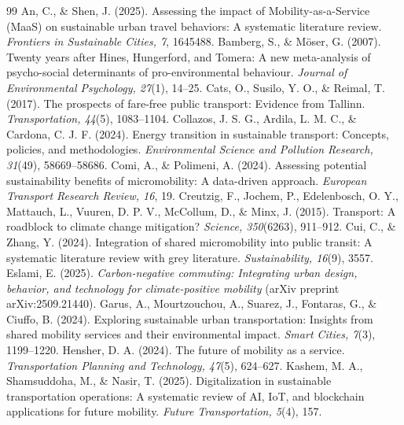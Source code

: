 \documentclass[11pt,a4paper]{article}
\begin{document}
\begin{thebibliography}{99}
\setlength{\itemsep}{0.2em}
 An, C., \& Shen, J. (2025). Assessing the impact of
Mobility-as-a-Service (MaaS) on sustainable urban travel behaviors: A systematic literature review.
\emph{Frontiers in Sustainable Cities, 7}, 1645488.
 Bamberg, S., \& M\"oser, G. (2007). Twenty years
after Hines, Hungerford, and Tomera: A new meta-analysis of psycho-social determinants of
pro-environmental behaviour. \emph{Journal of Environmental Psychology, 27}(1), 14--25.
 Cats, O., Susilo, Y. O., \& Reimal, T. (2017). The prospects of
fare-free public transport: Evidence from Tallinn. \emph{Transportation, 44}(5), 1083--1104.
 Collazos, J. S. G., Ardila, L. M. C., \& Cardona, C. J.
F. (2024). Energy transition in sustainable transport: Concepts, policies, and methodologies.
\emph{Environmental Science and Pollution Research, 31}(49), 58669--58686.
 Comi, A., \& Polimeni, A. (2024). Assessing potential
sustainability benefits of micromobility: A data-driven approach. \emph{European Transport Research
Review, 16}, 19.
 Creutzig, F., Jochem, P., Edelenbosch, O. Y., Mattauch,
L., Vuuren, D. P. V., McCollum, D., \& Minx, J. (2015). Transport: A roadblock to climate change
mitigation? \emph{Science, 350}(6263), 911--912.
 Cui, C., \& Zhang, Y. (2024). Integration of shared
micromobility into public transit: A systematic literature review with grey literature.
\emph{Sustainability, 16}(9), 3557.
 Eslami, E. (2025). \emph{Carbon-negative commuting: Integrating
urban design, behavior, and technology for climate-positive mobility} (arXiv preprint
arXiv:2509.21440).
 Garus, A., Mourtzouchou, A., Suarez, J., Fontaras, G., \&
Ciuffo, B. (2024). Exploring sustainable urban transportation: Insights from shared mobility services
and their environmental impact. \emph{Smart Cities, 7}(3), 1199--1220.
 Hensher, D. A. (2024). The future of mobility as a service.
\emph{Transportation Planning and Technology, 47}(5), 624--627.
 Kashem, M. A., Shamsuddoha, M., \& Nasir, T. (2025).
Digitalization in sustainable transportation operations: A systematic review of AI, IoT, and
blockchain applications for future mobility. \emph{Future Transportation, 5}(4), 157.

\end{thebibliography}
\end{document}
